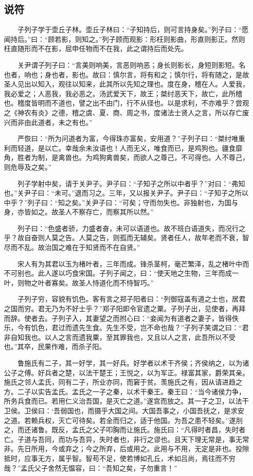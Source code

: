 \hypertarget{ux8bf4ux7b26}{%
\subsection{说符}\label{ux8bf4ux7b26}}

　　子列子学于壶丘子林。壶丘子林曰：``子知持后，则可言持身矣。''列子曰：``愿闻持后。''曰：``顾若影，则知之。''列子顾而观影：形枉则影曲，形直则影正。然则枉直随形而不在影，屈申任物而不在我，此之谓持后而处先。

　　关尹谓子列子曰：``言美则响美，言恶则响恶；身长则影长，身短则影短。名也者，响也；身也者，影也。故曰：慎尔言，将有和之；慎尔行，将有随之，是故圣人见出以知入，观往以知来，此其所以先知之理也。度在身，稽在人。人爱我，我必爱之；人恶我，我必恶之。汤武爱天下，故王；桀纣恶天下，故亡，此所稽也。稽度皆明而不道也，譬之出不由门，行不从径也。以是求利，不亦难乎？尝观之《神农有炎》之德，稽之虞、夏、商、周之书，度诸法士贤人之言，所以存亡废兴而非由此道者，未之有也。''

　　严恢曰：``所为问道者为富，今得珠亦富矣，安用道？''子列子曰：``桀纣唯重利而轻道，是以亡。幸哉余未汝语也！人而无义，唯食而已，是鸡狗也。疆食靡角，胜者为制，是禽兽也。为鸡狗禽兽矣，而欲人之尊己，不可得也。人不尊己，则危辱及之矣。''

　　列子学射中矣，请于关尹子。尹子曰：``子知子之所以中者乎？''对曰：``弗知也。''关尹子曰：``未可。''退而习之。三年，又以报关尹子。尹子曰：``子知子之所以中乎？''列子曰：``知之矣。''关尹子曰：``可矣；守而勿失也。非独射也，为国与身，亦皆如之。故圣人不察存亡，而察其所以然。''

　　列子曰：``色盛者骄，力盛者奋，未可以语道也。故不班白语道失，而况行之乎？故自奋则人莫之告。人莫之告，则孤而无辅矣。贤者任人，故年老而不衰，智尽而不乱。故治国之难在于知贤而不在自贤。''

　　宋人有为其君以玉为楮叶者，三年而成。锋杀茎柯，毫芒繁泽，乱之楮叶中而不可别也。此人遂以巧食宋国。子列子闻之，曰：``使天地之生物，三年而成一叶，则物之叶者寡矣。故圣人恃道化而不恃智巧。''

　　子列子穷，容貌有饥色。客有言之郑子阳者曰：``列御寇盖有道之士也，居君之国而穷。君无乃为不好士乎？''郑子阳即令官遗之粟。子列子出，见使者，再拜而辞。使者去。子列子入，其妻望之而拊心曰：``妾闻为有道者之妻子，皆得佚乐，今有饥色，君过而遗先生食。先生不受，岂不命也哉？''子列子笑谓之曰：``君非自知我也。以人之言而遗我粟，至其罪我也，又且以人之言，此吾所以不受也。''其卒，民果作难，而杀子阳。

　　鲁施氏有二子，其一好学，其一好兵。好学者以术干齐侯；齐侯纳之，以为诸公子之傅。好兵者之楚，以法干楚王；王悦之，以为军正。禄富其家，爵荣其亲。施氏之邻人孟氏，同有二子，所业亦同，而窘于贫。羡施氏之有，因从请进趋之方。二子以实告孟氏。孟氏之一子之秦，以术干秦王。秦王曰：``当今诸侯力争，所务兵食而已。若用仁义治吾国，是灭亡之道。''遂宫而放之。其一子之卫，以法干卫侯。卫侯曰：`吾弱国也，而摄乎大国之间。大国吾事之，小国吾抚之，是求安之道。若赖兵权，灭亡可待矣。若全而归之，适于他国。为吾之患不轻矣。''遂刖之，而还诸鲁。既反，孟氏之父子叩胸而让施氏。施氏曰：``凡得时者昌，失时者亡。子道与吾同，而功与吾异，失时者也，非行之谬也。且天下理无常是，事无常非。先日所用，今或弃之；今之所弃，后或用之。此用与不用，无定是非也。投隙抵时，应事无方，属乎智。智苟不足，使若博如孔丘，术如吕尚，焉往而不穷哉？''孟氏父子舍然无愠容，曰：``吾知之矣，子勿重言！''

